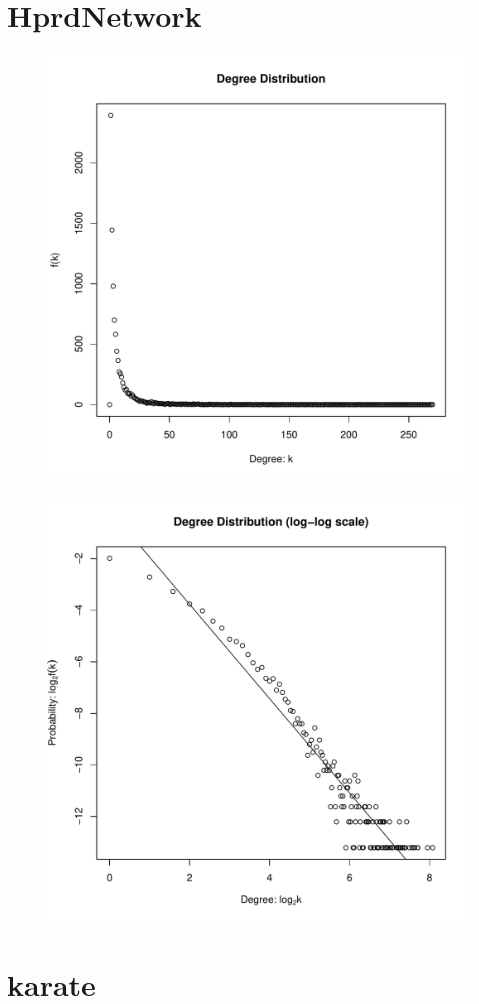 \documentclass{report}
\begin{document}
\newpage

\section*{HprdNetwork}

\begin{figure}[htp!]
  \centering
  \includegraphics[width=0.65\linewidth]{HprdNetwork}
\end{figure}
\vspace{-2em}
\begin{figure}[htp!]
  \centering
  \includegraphics[width=0.65\linewidth]{HprdNetworkLog}
\end{figure}

\newpage

\section*{karate}
\end{document}
